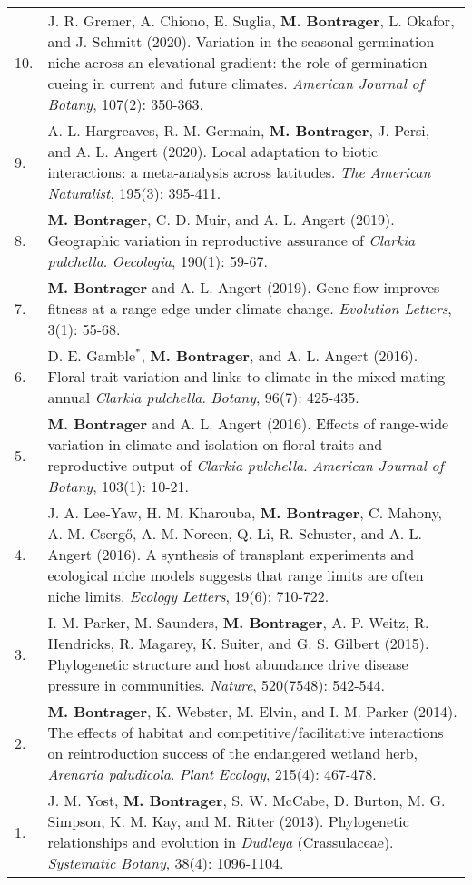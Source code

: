 \documentclass[letterpaper,11pt,oneside]{article}
\begin{document}
\noindent \begin{tabular}{@{} p{0.5cm} >{\raggedright\arraybackslash}p{16.7cm}}
10. & J. R. Gremer, A. Chiono, E. Suglia, \textbf{M. Bontrager}, L. Okafor, and J. Schmitt (2020). Variation in the seasonal germination niche across an elevational gradient: the role of germination cueing in current and future climates. \textit{American Journal of Botany}, 107(2): 350-363. \\
9. & A. L. Hargreaves, R. M. Germain, \textbf{M. Bontrager}, J. Persi, and A. L. Angert (2020). Local adaptation to biotic interactions: a meta-analysis across latitudes. \textit{The American Naturalist}, 195(3): 395-411. \\
8. & \textbf{M. Bontrager}, C. D. Muir, and A. L. Angert (2019). Geographic variation in reproductive assurance of \textit{Clarkia pulchella}. \textit{Oecologia}, 190(1): 59-67. \\
7. & \textbf{M. Bontrager} and A. L. Angert (2019). Gene flow improves fitness at a range edge under climate change. \textit{Evolution Letters}, 3(1): 55-68. \\
6. & D. E. Gamble$^{*}$, \textbf{M. Bontrager}, and A. L. Angert (2016). Floral trait variation and links to climate in the mixed-mating annual \textit{Clarkia pulchella}. \textit{Botany}, 96(7): 425-435. \\
5. & \textbf{M. Bontrager} and A. L. Angert (2016). Effects of range-wide variation in climate and isolation on floral traits and reproductive output of \textit{Clarkia pulchella}. \textit{American Journal of Botany}, 103(1): 10-21.  \\
4. & J. A. Lee-Yaw, H. M. Kharouba, \textbf{M. Bontrager}, C. Mahony, A. M. Cserg{\H{o}}, A. M. Noreen, Q. Li, R. Schuster, and A. L. Angert (2016). A synthesis of transplant experiments and ecological niche models suggests that range limits are often niche limits. \textit{Ecology Letters}, 19(6): 710-722. \\
3. & I. M. Parker, M. Saunders, \textbf{M. Bontrager}, A. P. Weitz, R. Hendricks, R. Magarey, K. Suiter, and G. S. Gilbert (2015). Phylogenetic structure and host abundance drive disease pressure in communities. \textit{Nature}, 520(7548): 542-544. \\
2. & \textbf{M. Bontrager}, K. Webster, M. Elvin, and I. M. Parker (2014). The effects of habitat and competitive/facilitative interactions on reintroduction success of the endangered wetland herb, \textit{Arenaria paludicola}. \textit{Plant Ecology}, 215(4): 467-478. \\
1. & J. M. Yost, \textbf{M. Bontrager}, S. W. McCabe, D. Burton, M. G. Simpson, K. M. Kay, and M. Ritter (2013). Phylogenetic relationships and evolution in \textit{Dudleya} (Crassulaceae). \textit{Systematic Botany}, 38(4): 1096-1104. \\
\end{tabular}
\end{document}
